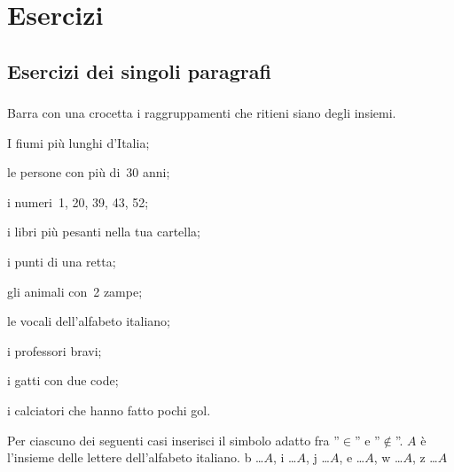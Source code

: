 
\section{Esercizi}

\subsection{Esercizi dei singoli paragrafi}

\subsubsection*{}

\begin{esercizio}
 \label{ese:5.1}
 Barra con una crocetta i raggruppamenti che ritieni siano degli insiemi.
 \begin{multicols}{2}
 \begin{enumeratea}
\item I fiumi più lunghi d'Italia;
\item le persone con più di~30 anni;
\item i numeri~1, 20, 39, 43, 52;
\item i libri più pesanti nella tua cartella;
\item i punti di una retta;
\item gli animali con~2 zampe;
\item le vocali dell'alfabeto italiano;
\item i professori bravi;
\item i gatti con due code;
\item i calciatori che hanno fatto pochi gol.
\end{enumeratea}
\end{multicols}
\end{esercizio}

\begin{esercizio}
 \label{ese:5.2}
Per ciascuno dei seguenti casi inserisci il simbolo adatto fra ''$\in$'' e 
''$\notin$''. $A$ è l'insieme delle lettere
dell'alfabeto italiano. b \ldots $A$, i \ldots $A$, j \ldots $A$, e \ldots $A$, 
w \ldots $A$, z \ldots $A$
\end{esercizio}

